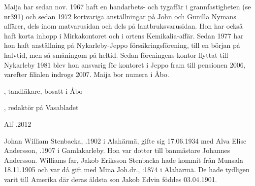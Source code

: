 Maija har sedan nov. 1967 haft en handarbets- och tygaffär i grannfastigheten (se nr391) och sedan 1972 kortvariga anställningar på John och Gunilla Nymans affärer, dels inom matvarusidan och dels på lantbruksvarusidan. Hon har också haft korta inhopp i Mirkakontoret och i ortens Kemikalia-affär. Sedan 1977 har hon  haft anställning på Nykarleby-Jeppo försäkringsförening, till en början på halvtid, men så småningom på heltid. Sedan föreningens kontor flyttat till Nykarleby 1981 blev hon ansvarig för kontoret i Jeppo fram till pensionen 2006, varefter filialen indrogs 2007. Maija bor numera i Åbo.
\begin{jhchildren}
  \item {}, tandläkare, bosatt i Åbo
  \item {}, redaktör på Vasabladet
\end{jhchildren}

Alf .2012


Johan William Stenbacka, .1902 i Alahärmä, gifte sig 17.06.1934 med Alva Elise Andersson, .1907 i Gamlakarleby. Hon var dotter till banmästare Johannes Andersson. Williams far, Jakob Eriksson Stenbacka hade kommit från Munsala 18.11.1905 och var då gift med Mina Joh.dr., :1874 i Alahärmä. De hade tydligen varit till Amerika där deras äldsta son Jakob Edvin föddes 03.04.1901.


